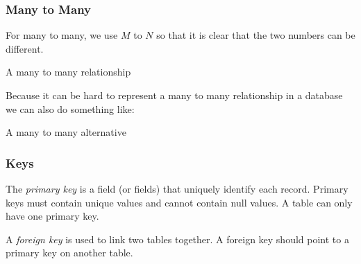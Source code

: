 \subsubsection{Many to Many}\label{ssub:many_to_many}

For many to many, we use \(M\) to \(N\) so that it is clear that the two numbers can be different.
\begin{highlight}{A many to many relationship}
    \begin{center}
    \end{center}
\end{highlight}
Because it can be hard to represent a many to many relationship in a database we can also do something like:

\begin{highlight}{A many to many alternative}
    \begin{center}
    \end{center}
\end{highlight}

\subsubsection{Keys}\label{ssub:keys}

The \emph{primary key} is a field (or fields) that uniquely identify each record.
Primary keys must contain unique values and cannot contain null values.
A table can only have one primary key.

A \emph{foreign key} is used to link two tables together.
A foreign key should point to a primary key on another table.

